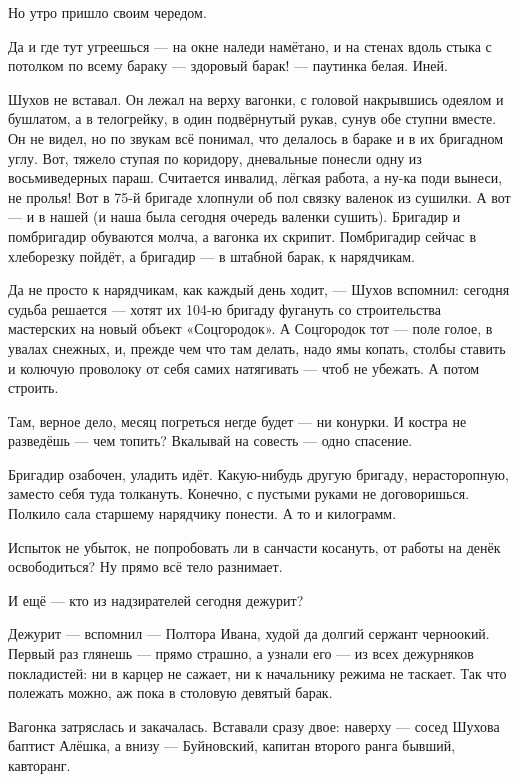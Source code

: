 Но утро пришло своим чередом.

Да и где тут угреешься --- на окне наледи намётано, и на стенах вдоль стыка с потолком по всему 
бараку --- здоровый барак! --- паутинка белая. Иней.

Шухов не вставал. Он лежал на верху вагонки, с головой накрывшись одеялом и бушлатом, а в 
телогрейку, в один подвёрнутый рукав, сунув обе ступни вместе. Он не видел, но по звукам всё 
понимал, что делалось в бараке и в их бригадном углу. Вот, тяжело ступая по коридору, 
дневальные понесли одну из восьмиведерных параш. Считается инвалид, лёгкая работа, а ну-ка 
поди вынеси, не пролья! Вот в 75-й бригаде хлопнули об пол связку валенок из сушилки. А вот --- и 
в нашей (и наша была сегодня очередь валенки сушить). Бригадир и помбригадир обуваются молча, 
а вагонка их скрипит. Помбригадир сейчас в хлеборезку пойдёт, а бригадир --- в штабной барак, к 
нарядчикам.

Да не просто к нарядчикам, как каждый день ходит, --- Шухов вспомнил: сегодня судьба решается 
--- хотят их 104-ю бригаду фугануть со строительства мастерских на новый объект «Соцгородок». А 
Соцгородок тот --- поле голое, в увалах снежных, и, прежде чем что там делать, надо ямы копать, 
столбы ставить и колючую проволоку от себя самих натягивать --- чтоб не убежать. А потом 
строить.

Там, верное дело, месяц погреться негде будет --- ни конурки. И костра не разведёшь --- чем 
топить? Вкалывай на совесть --- одно спасение.

Бригадир озабочен, уладить идёт. Какую-нибудь другую бригаду, нерасторопную, заместо себя 
туда толкануть. Конечно, с пустыми руками не договоришься. Полкило сала старшему нарядчику 
понести. А то и килограмм.

Испыток не убыток, не попробовать ли в санчасти косануть, от работы на денёк освободиться? Ну 
прямо всё тело разнимает.

И ещё --- кто из надзирателей сегодня дежурит?

Дежурит --- вспомнил --- Полтора Ивана, худой да долгий сержант черноокий. Первый раз глянешь --- 
прямо страшно, а узнали его --- из всех дежурняков покладистей: ни в карцер не сажает, ни к 
начальнику режима не таскает. Так что полежать можно, аж пока в столовую девятый барак.

Вагонка затряслась и закачалась. Вставали сразу двое: наверху --- сосед Шухова баптист 
Алёшка, а внизу --- Буйновский, капитан второго ранга бывший, кавторанг.

